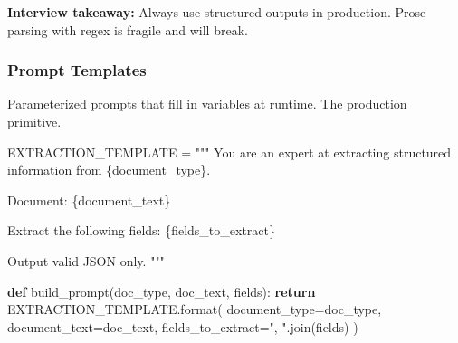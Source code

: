 \documentclass[11pt]{article}
\newenvironment{Shaded}{\begin{snugshade}}{\end{snugshade}}
\newcommand{\BuiltInTok}[1]{\textcolor[rgb]{0.50,0.55,0.55}{#1}}
\newcommand{\CommentTok}[1]{\textcolor[rgb]{0.48,0.49,0.49}{#1}}
\newcommand{\ControlFlowTok}[1]{\textcolor[rgb]{0.99,0.74,0.29}{\textbf{#1}}}
\newcommand{\DecValTok}[1]{\textcolor[rgb]{0.96,0.45,0.00}{#1}}
\newcommand{\ImportTok}[1]{\textcolor[rgb]{0.15,0.68,0.38}{#1}}
\newcommand{\KeywordTok}[1]{\textcolor[rgb]{0.81,0.81,0.76}{\textbf{#1}}}
\newcommand{\NormalTok}[1]{\textcolor[rgb]{0.81,0.81,0.76}{#1}}
\newcommand{\OperatorTok}[1]{\textcolor[rgb]{0.81,0.81,0.76}{#1}}
\newcommand{\SpecialCharTok}[1]{\textcolor[rgb]{0.24,0.68,0.91}{#1}}
\newcommand{\StringTok}[1]{\textcolor[rgb]{0.96,0.31,0.31}{#1}}
\begin{document}

\begin{Shaded}
\end{Shaded}

\textbf{Interview takeaway:} Always use structured outputs in production. Prose parsing with regex is fragile and will break.

\subsubsection{Prompt Templates}\label{prompt-templates}

Parameterized prompts that fill in variables at runtime. The production primitive.


\begin{Shaded}
\begin{Highlighting}[]
\NormalTok{EXTRACTION\_TEMPLATE }\OperatorTok{=} \StringTok{"""}
\StringTok{You are an expert at extracting structured information from }\SpecialCharTok{\{document\_type\}}\StringTok{.}

\StringTok{Document:}
\SpecialCharTok{\{document\_text\}}

\StringTok{Extract the following fields:}
\SpecialCharTok{\{fields\_to\_extract\}}

\StringTok{Output valid JSON only.}
\StringTok{"""}

\KeywordTok{def}\NormalTok{ build\_prompt(doc\_type, doc\_text, fields):}
    \ControlFlowTok{return}\NormalTok{ EXTRACTION\_TEMPLATE.}\BuiltInTok{format}\NormalTok{(}
\NormalTok{        document\_type}\OperatorTok{=}\NormalTok{doc\_type,}
\NormalTok{        document\_text}\OperatorTok{=}\NormalTok{doc\_text,}
\NormalTok{        fields\_to\_extract}\OperatorTok{=}\StringTok{", "}\NormalTok{.join(fields)}
\NormalTok{    )}
\end{Highlighting}
\end{Shaded}
\end{document}
